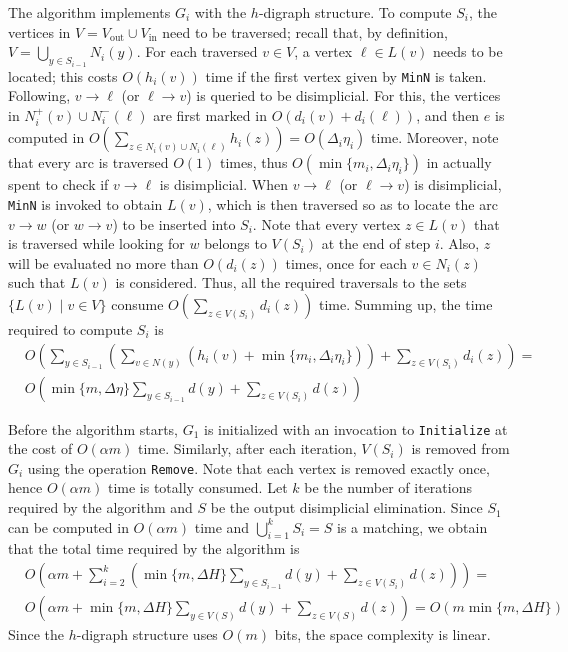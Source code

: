 \documentclass[a4paper,11pt]{article}
\newcommand{\IN}{\ensuremath{\mathrm{in}}}
\newcommand{\OUT}{\ensuremath{\mathrm{out}}}
\begin{document}
The algorithm implements $G_i$ with the $h$-digraph structure.  To compute $S_i$, the vertices in $V = V_{\OUT} \cup V_{\IN}$ need to be traversed; recall that, by definition, $V = \bigcup_{y \in S_{i-1}}N_i(y)$.  For each traversed $v \in V$, a vertex $\ell \in L(v)$ needs to be located; this costs $O(h_i(v))$ time if the first vertex given by \texttt{MinN} is taken. Following, $v \to \ell$ (or $\ell \to v$) is queried to be disimplicial.  For this, the vertices in $N_i^+(v) \cup N_i^-(\ell)$ are first marked in $O(d_i(v) + d_i(\ell))$, and then $e$ is computed in $O\left(\sum_{z \in N_i(v) \cup N_i(\ell)}h_i(z)\right) = O(\Delta_i \eta_i)$ time.  Moreover, note that every arc is traversed $O(1)$ times, thus $O(\min\{m_i, \Delta_i \eta_i\})$ in actually spent to check if $v \to \ell$ is disimplicial.  When $v \to \ell$ (or $\ell \to v$) is disimplicial, \texttt{MinN} is invoked to obtain $L(v)$, which is then traversed so as to locate the arc $v \to w$ (or $w \to v$) to be inserted into $S_i$.  Note that every vertex $z \in L(v)$ that is traversed while looking for $w$ belongs to $V(S_i)$ at the end of step $i$.  Also, $z$ will be evaluated no more than $O(d_i(z))$ times, once for each $v \in N_i(z)$ such that $L(v)$ is considered.  Thus, all the required traversals to the sets $\{L(v) \mid v \in V\}$ consume $O\left(\sum_{z \in V(S_i)}{d_i(z)}\right)$ time. Summing up, the time required to compute $S_i$ is
\begin{align*}
&O\left(
    \sum_{y \in S_{i-1}}\left(
        \sum_{v \in N(y)}(
           h_i(v) + \min\{m_i, \Delta_i \eta_i\}
        )
     \right) + 
     \sum_{z \in V(S_i)}d_i(z)
\right)
  =\\
&O\left(
  \min\{m, \Delta \eta\}\sum_{y\in S_{i-1}}d(y) + 
  \sum_{z \in V(S_i)}d(z)
\right)
\end{align*}


Before the algorithm starts, $G_1$ is initialized with an invocation to \texttt{Initialize} at the cost of $O(\alpha m)$ time.  Similarly, after each iteration, $V(S_i)$ is removed from $G_i$ using the operation \texttt{Remove}.  Note that each vertex is removed exactly once, hence $O(\alpha m)$ time is totally consumed.   Let $k$ be the number of iterations required by the algorithm and $S$ be the output disimplicial elimination.  Since $S_1$ can be computed in $O(\alpha m)$ time and $\bigcup_{i=1}^k S_i = S$ is a matching, we obtain that the total time required by the algorithm is
\begin{align*}
&O\left(
  \alpha m + 
  \sum_{i=2}^k\left(
      \min\{m, \Delta H\}\sum_{y\in S_{i-1}}d(y) + \sum_{z \in V(S_i)}d(z)
  \right)
\right) =\\ 
&O\left(\alpha m + \min\{m, \Delta H\}\sum_{y \in V(S)}d(y) + \sum_{z \in V(S)}d(z)\right) = O(m\min\{m, \Delta H\})
\end{align*}
Since the $h$-digraph structure uses $O(m)$ bits, the space complexity is linear.
\end{document}
